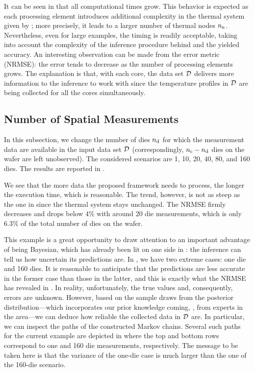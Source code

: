 It can be seen in  that all computational times grow. This behavior is expected as each processing element introduces additional complexity in the thermal system given by ; more precisely, it leads to a larger number of thermal nodes ${n_\text{n}}$. Nevertheless, even for large examples, the timing is readily acceptable, taking into account the complexity of the inference procedure behind and the yielded accuracy.
An interesting observation can be made from the error metric (NRMSE): the error tends to decrease as the number of processing elements grows. The explanation is that, with each core, the data set $\mathcal{D}$ delivers more information to the inference to work with since the temperature profiles in $\mathcal{D}$ are being collected for all the cores simultaneously.

\subsection{Number of Spatial Measurements}

In this subsection, we change the number of dies ${n_{\text{d}}}$ for which the measurement data are available in the input data set $\mathcal{D}$ (correspondingly, ${n_{\text{c}}} - {n_{\text{d}}}$ dies on the wafer are left unobserved). The considered scenarios are 1, 10, 20, 40, 80, and 160 dies. The results are reported in .


We see that the more data the proposed framework needs to process, the longer the execution time, which is reasonable. The trend, however, is not as steep as the one in  since the thermal system stays unchanged.
The NRMSE firmly decreases and drops below $4\%$ with around 20 die measurements, which is only $6.3\%$ of the total number of dies on the wafer.

This example is a great opportunity to draw attention to an important advantage of being Bayesian, which has already been lit on one side in : the inference can tell us how uncertain its predictions are. In , we have two extreme cases: one die and 160 dies. It is reasonable to anticipate that the predictions are less accurate in the former case than those in the latter, and this is exactly what the NRMSE has revealed in . In reality, unfortunately, the true values and, consequently, errors are unknown. However, based on the sample draws from the posterior distribution---which incorporates our prior knowledge coming, \eg, from experts in the area---we can deduce how reliable the collected data in $\mathcal{D}$ are. In particular, we can inspect the paths of the constructed Markov chains. Several such paths for the current example are depicted in  where the top and bottom rows correspond to one and 160 die measurements, respectively. The message to be taken here is that the variance of the one-die case is much larger than the one of the 160-die scenario.

